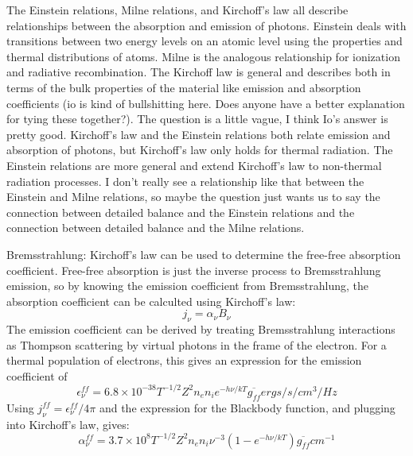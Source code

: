 \begin{enumerate}
      The Einstein relations, Milne relations, and Kirchoff's law all describe relationships between the absorption and emission of photons. Einstein deals with transitions between two energy levels on an atomic level using the properties and thermal distributions of atoms. Milne is the analogous relationship for ionization and radiative recombination. The Kirchoff law is general and describes both in terms of the bulk properties of the material like emission and absorption coefficients (io is kind of bullshitting here. Does anyone have a better explanation for tying these together?).
      The question is a little vague, I think Io's answer is pretty good.  
      Kirchoff's law and the Einstein relations both relate emission and 
      absorption of photons, but Kirchoff's law only holds for thermal 
      radiation.  The Einstein relations are more general and extend Kirchoff's 
      law to non-thermal radiation processes.  I don't really 
      see a relationship like that between the Einstein and Milne relations, 
      so maybe the question just wants us to say the connection between 
      detailed balance and the Einstein relations and the connection between 
      detailed balance and the Milne relations.
      
      Bremsstrahlung:\newline
      Kirchoff's law can be used to determine the free-free absorption coefficient.  Free-free 
      absorption is just the inverse process to Bremsstrahlung emission, so by knowing the 
      emission coefficient from Bremsstrahlung, the absorption coefficient can be calculted using 
      Kirchoff's law:
      \begin{displaymath}j_{\nu}=\alpha_{\nu}B_{\nu}\end{displaymath}
      The emission coefficient can be derived by treating Bremsstrahlung interactions as Thompson 
      scattering by virtual photons in the frame of the electron.  For a thermal population 
      of electrons, this gives an expression for the emission coefficient of 
      \begin{displaymath}\epsilon_{\nu}^{ff}=6.8\times10^{-38}T^{-1/2}Z^2n_en_ie^{-h\nu/kT}\overline{g_{ff}}ergs/s/cm^3/Hz\end{displaymath}
      Using $j_{\nu}^{ff}=\epsilon_{\nu}^{ff}/4\pi$ and the expression for the Blackbody function, and 
      plugging into Kirchoff's law, gives:
      \begin{displaymath}\alpha_{\nu}^{ff}=3.7\times10^8T^{-1/2}Z^2n_en_i\nu^{-3}(1-e^{-h\nu/kT})\overline{g_{ff}}cm^{-1}\end{displaymath}


\end{enumerate}
